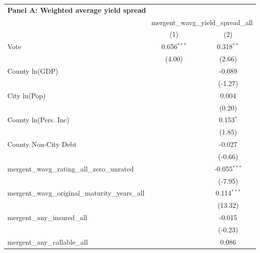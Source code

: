 \begingroup
\centering
\begin{tabular*}{\textwidth}{@{\extracolsep{\fill}}lcc}
\multicolumn{3}{l}{\textbf{Panel A: Weighted average yield spread}}\\

\addlinespace
   \toprule
    & \multicolumn{2}{c}{mergent\_wavg\_yield\_spread\_all}\\
   \cmidrule(lr){2-3}
                                                      & (1)           & (2)\\  
   \midrule 
   Vote                                               & 0.656$^{***}$ & 0.318$^{**}$\\   
                                                      & (4.00)       & (2.66)\\   
   County ln(GDP)                                     &               & -0.089\\   
                                                      &               & (-1.27)\\   
   City ln(Pop)                                       &               & 0.004\\   
                                                      &               & (0.20)\\   
   County ln(Pers. Inc)                               &               & 0.153$^{*}$\\   
                                                      &               & (1.85)\\   
   County Non-City Debt                               &               & -0.027\\   
                                                      &               & (-0.66)\\   
   mergent\_wavg\_rating\_all\_zero\_unrated          &               & -0.055$^{***}$\\   
                                                      &               & (-7.95)\\   
   mergent\_wavg\_original\_maturity\_years\_all      &               & 0.114$^{***}$\\   
                                                      &               & (13.32)\\   
   mergent\_any\_insured\_all                         &               & -0.015\\   
                                                      &               & (-0.23)\\   
   mergent\_any\_callable\_all                        &               & 0.086\\   

\end{tabular*}
